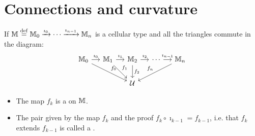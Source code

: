 \documentclass[14pt,aspectratio=169]{beamer}
\begin{document}
\section{Connections and curvature}
\begin{frame}
\begin{definition}
If \( \mathbb{M}\stackrel{\mathrm{def}}{=} \mathbb{M}_0\xrightarrow[]{\imath_0}\cdots\xrightarrow[]{\imath_{n-1}}\mathbb{M}_n \) is a cellular type and all the triangles commute in the diagram:\vspace{-10pt}
\[\begin{tikzcd}[ampersand replacement=\&, column sep=small]
  {\mm_0} \& {\mm_1} \& {\mm_2} \& \cdots \& {\mm_n} \\
\&\& {\mathcal{U}}
\arrow["{\imath_0}", from=1-1, to=1-2]
\arrow["{f_0}", from=1-1, to=2-3]
\arrow["{\imath_1}", from=1-2, to=1-3]
\arrow["{f_1}", from=1-2, to=2-3]
\arrow["{\imath_2}", from=1-3, to=1-4]
\arrow["{f_2}", from=1-3, to=2-3]
\arrow["{\imath_{n-1}}", from=1-4, to=1-5]
\arrow["f_n"', from=1-5, to=2-3]
\end{tikzcd}\]\vspace{-15pt}
\begin{itemize}
\item The map \( f_k \) is a  on \( \mathbb{M} \).
\item The pair given by the map \( f_k \) and the proof \( f_k\circ \imath_{k-1}=f_{k-1} \), i.e. that \( f_k \) extends \( f_{k-1} \) is called a .
\end{itemize}
\end{definition}
\end{frame}
\end{document}
